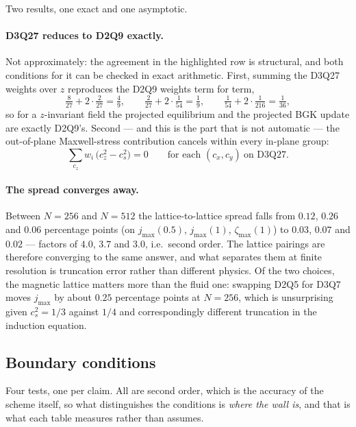 \documentclass[11pt,a4paper]{article}
\newcommand{\cs}{c_s}
\begin{document}
Two results, one exact and one asymptotic.

\paragraph{D3Q27 reduces to D2Q9 exactly.} Not approximately: the agreement in
the highlighted row is structural, and both conditions for it can be checked in
exact arithmetic. First, summing the D3Q27 weights over $z$ reproduces the D2Q9
weights term for term,
\begin{equation}
  \tfrac{8}{27}+2\cdot\tfrac{2}{27} = \tfrac49, \qquad
  \tfrac{2}{27}+2\cdot\tfrac{1}{54} = \tfrac19, \qquad
  \tfrac{1}{54}+2\cdot\tfrac{1}{216} = \tfrac1{36},
\end{equation}
so for a $z$-invariant field the projected equilibrium and the projected BGK
update are exactly D2Q9's. Second --- and this is the part that is not automatic
--- the out-of-plane Maxwell-stress contribution cancels within every in-plane
group:
\begin{equation}
  \sum_{c_z} w_i\,\big(c_z^2-\cs^2\big) = 0
  \qquad\text{for each } (c_x,c_y) \ \text{on D3Q27}.
\end{equation}

\paragraph{The spread converges away.} Between $N=256$ and $N=512$ the
lattice-to-lattice spread falls from $0.12$, $0.26$ and $0.06$ percentage points
(on $j_{\max}(0.5)$, $j_{\max}(1)$, $\zeta_{\max}(1)$) to $0.03$, $0.07$ and
$0.02$ --- factors of $4.0$, $3.7$ and $3.0$, i.e.\ second order. The lattice
pairings are therefore converging to the same answer, and what separates them at finite
resolution is truncation error rather than different physics. Of the two
choices, the magnetic lattice matters more than the fluid one: swapping D2Q5 for
D3Q7 moves $j_{\max}$ by about $0.25$ percentage points at $N=256$, which is
unsurprising given $\cs^2=1/3$ against $1/4$ and correspondingly different
truncation in the induction equation.

\subsection{Boundary conditions}
\label{sec:bcvalid}

Four tests, one per claim. All are second order, which is the accuracy of the
scheme itself, so what distinguishes the conditions is \emph{where the wall is},
and that is what each table measures rather than assumes.
\end{document}
